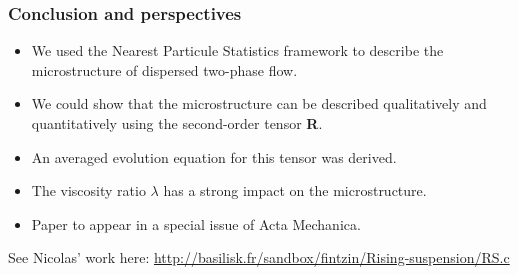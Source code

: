 \documentclass{sintefbeamer}
\begin{document}
\begin{frame}
  \frametitle{Conclusion and perspectives}

  \begin{itemize}
    \item We used the Nearest Particule Statistics framework to describe the microstructure of dispersed two-phase flow. 
    \item We could show that the microstructure can be described qualitatively and quantitatively using the second-order tensor \textbf{R}.
    \item An averaged evolution equation for this tensor was derived.
    \item The viscosity ratio $\lambda$ has a strong impact on the microstructure. 
    \item Paper to appear in a special issue of Acta Mechanica.
  \end{itemize}
\vfill    
See Nicolas' work here: \url{http://basilisk.fr/sandbox/fintzin/Rising-suspension/RS.c}

\end{frame}


 
\backmatter
\end{document}
